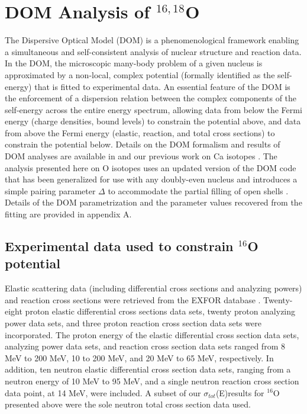 \documentclass[twocolumn,secnumarabic,amssymb, nobibnotes, aps, prl,
superscriptaddress, nobalancelastpage]{revtex4}
\newcommand{\totE}{\ensuremath{\sigma_{tot}}(E)}
\begin{document}
\section{DOM Analysis of $^{16,18}$O}

The Dispersive Optical Model (DOM) is a phenomenological framework enabling
a simultaneous and self-consistent analysis of nuclear structure and reaction
data. In the DOM, the microscopic many-body problem of a given nucleus is
approximated by a non-local, complex potential (formally identified as the
self-energy) that is fitted to experimental data. An essential feature of the
DOM is the enforcement of a dispersion
relation between the complex components of the self-energy across the entire
energy spectrum, allowing data from below the Fermi energy (charge densities,
bound levels) to constrain the potential above, and data from above the Fermi
energy (elastic, reaction, and total cross sections) to constrain the potential
below. Details on the DOM formalism and results of DOM analyses are available in
\cite{Mahaux1991, Dickhoff2018} and our previous work on Ca isotopes
\cite{MahzoonPhDThesis}. The analysis presented here on O isotopes uses an updated version
of the DOM code that has been generalized for use with any doubly-even nucleus
and introduces a simple pairing parameter $\Delta$ to accommodate the partial filling
of open shells \cite{FetterAndWalecka}. Details of the DOM parametrization and the parameter values
recovered from the fitting are provided in appendix A.

\subsection{Experimental data used to constrain $^{16}$O potential}

Elastic scattering data (including differential cross sections and analyzing
powers) and reaction cross sections were retrieved from the
EXFOR database \cite{EXFOR}. Twenty-eight proton elastic differential cross
sections data sets, twenty proton analyzing power data sets,
and three proton reaction cross section data sets were
incorporated. The proton energy of the elastic differential cross section
data sets, analyzing power data sets, and reaction cross section data sets
ranged from 8 MeV to 200 MeV, 10 to 200 MeV, and 20 MeV to 65
MeV, respectively. In addition, ten neutron elastic differential cross section
data sets, ranging from a neutron energy of 10 MeV to 95 MeV, and a single
neutron reaction cross section data point, at 14 MeV, were included. 
A subset of our \totE results for $^{16}$O presented above
were the sole neutron total cross section data used.
\end{document}
